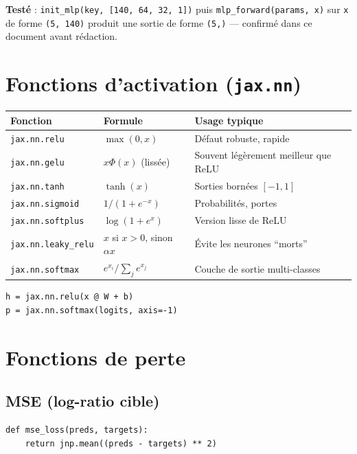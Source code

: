 \documentclass[11pt,a4paper]{article}
\begin{document}
\begin{mdframed}
\textbf{Testé} : \texttt{init\_mlp(key, [140, 64, 32, 1])} puis
\texttt{mlp\_forward(params, x)} sur \texttt{x} de forme \texttt{(5, 140)}
produit une sortie de forme \texttt{(5,)} --- confirmé dans ce
document avant rédaction.
\end{mdframed}

\section{Fonctions d'activation (\texttt{jax.nn})}

\begin{center}
\begin{tabular}{lll}
\toprule
Fonction & Formule & Usage typique \\
\midrule
\texttt{jax.nn.relu}       & $\max(0,x)$                         & Défaut robuste, rapide \\
\texttt{jax.nn.gelu}       & $x\Phi(x)$ (lissée)                 & Souvent légèrement meilleur que ReLU \\
\texttt{jax.nn.tanh}       & $\tanh(x)$                           & Sorties bornées $[-1,1]$ \\
\texttt{jax.nn.sigmoid}    & $1/(1+e^{-x})$                       & Probabilités, portes \\
\texttt{jax.nn.softplus}   & $\log(1+e^x)$                        & Version lisse de ReLU \\
\texttt{jax.nn.leaky\_relu}& $x$ si $x>0$, sinon $\alpha x$        & Évite les neurones ``morts'' \\
\texttt{jax.nn.softmax}    & $e^{x_i}/\sum_j e^{x_j}$              & Couche de sortie multi-classes \\
\bottomrule
\end{tabular}
\end{center}

\begin{lstlisting}
h = jax.nn.relu(x @ W + b)
p = jax.nn.softmax(logits, axis=-1)
\end{lstlisting}

\section{Fonctions de perte}

\subsection{MSE (log-ratio cible)}
\begin{lstlisting}
def mse_loss(preds, targets):
    return jnp.mean((preds - targets) ** 2)
\end{lstlisting}
\end{document}
